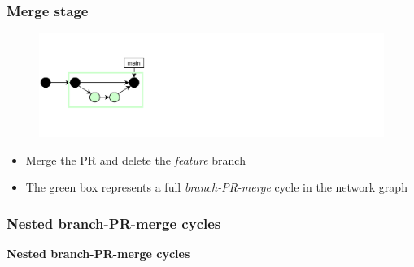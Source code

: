 \documentclass[aspectratio=169]{beamer} %
\begin{document}
\begin{frame}
	\frametitle{Merge stage}

	\vspace{-.5cm}
	\begin{minipage}[t][5cm][t]{\textwidth}
		\begin{figure}
			\centering
			\includegraphics[width=\textwidth]{./img/dime-gitflow-network-1-3.png}
		\end{figure}
	\end{minipage}

	\vspace{-.5cm}
	\begin{minipage}[t][5cm][t]{\textwidth}
		\begin{itemize}
			\setlength\itemsep{.5em}
			\item Merge the PR and delete the \textit{feature} branch
			\item The green box represents
			a full \textit{branch-PR-merge} cycle in the network graph
		\end{itemize}
	\end{minipage}

\end{frame}

\begin{frame}
	\frametitle{Nested branch-PR-merge cycles}

	\huge\centering \textbf{Nested branch-PR-merge cycles}

\end{frame}
\end{document}
